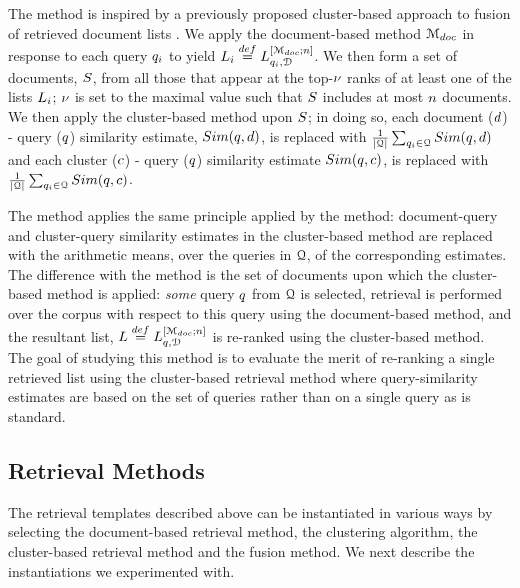\myparagraph{\poolClustNoR} The \firstmention{\poolClustNoR} method is
inspired by a previously proposed cluster-based approach to fusion of
retrieved document lists \cite{Kozorovitzky+Kurland:11b}. We apply the
document-based method ${\mathcal M_{doc}}$ in response to each query
$q_i$ to yield $L_i \stackrel{def}{=}
L_{q_i,{\mathcal D}}^{[{\mathcal M_{doc}};n]}$. We then form a
set of documents, $S$, from all those that appear at the
top-$\nu$ ranks of at least one of the lists $L_i$;
$\nu$ is set to the maximal value such that $S$ includes
at most $n$ documents. We then apply the cluster-based method upon $S$; in doing so, each document ($d$) - query ($q$) similarity estimate, $Sim(q,d)$, is replaced with $\frac{1}{\vert {\mathcal Q} \vert} \sum_{q_i \in {\mathcal Q}} Sim(q,d)$ and each cluster ($c$) - query ($q$) similarity estimate $Sim(q,c)$, is replaced with $\frac{1}{\vert {\mathcal Q} \vert} \sum_{q_i \in {\mathcal Q}} Sim(q,c)$.

\myparagraph{\featureNoR}
The \firstmention{\featureNoR} method applies the same principle applied by the \poolClust method: document-query and cluster-query similarity estimates in the cluster-based method are replaced with the arithmetic means, over the queries in ${\mathcal Q}$, of the corresponding estimates. The difference with the \poolClust method is the set of documents upon which the cluster-based method is applied: {\em some} query $q$ from ${\mathcal Q}$ is selected, retrieval is performed over the corpus with respect to this query using the document-based method, and the resultant list, $L \stackrel{def}{=} L_{q,{\mathcal D}}^{[{\mathcal M_{doc}};n]}$ is re-ranked using the cluster-based method. The goal of studying this method is to evaluate the merit of re-ranking a single retrieved list using the cluster-based retrieval method where query-similarity estimates are based on the set of queries rather than on a single query as is standard.

\subsection{Retrieval Methods}
\label{sec:retAlg}
The retrieval templates described above can be instantiated in various
ways by selecting the document-based retrieval method, the clustering
algorithm, the cluster-based retrieval method and the fusion
method. We next describe the instantiations we experimented with.


